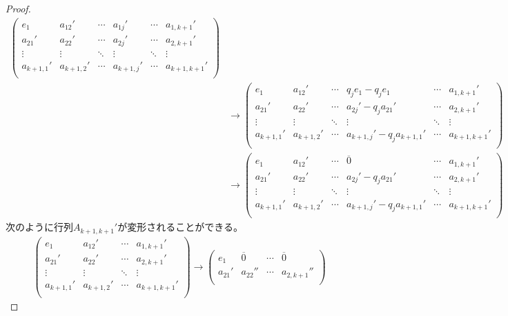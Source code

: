 \documentclass[dvipdfmx]{jsarticle}
\begin{document}
\begin{proof}
\begin{align*}
\begin{pmatrix}
e_{1} & a_{12}' & \cdots & a_{1j}' & \cdots & a_{1,k + 1}' \\
a_{21}' & a_{22}' & \cdots & a_{2j}' & \cdots & a_{2,k + 1}' \\
 \vdots & \vdots & \ddots & \vdots & \ddots & \vdots \\
a_{k + 1,1}' & a_{k + 1,2}' & \cdots & a_{k + 1,j}' & \cdots & a_{k + 1,k + 1}' \\
\end{pmatrix}\\
&\rightarrow \begin{pmatrix}
e_{1} & a_{12}' & \cdots & q_{j}e_{1} - q_{j}e_{1} & \cdots & a_{1,k + 1}' \\
a_{21}' & a_{22}' & \cdots & a_{2j}' - q_{j}a_{21}' & \cdots & a_{2,k + 1}' \\
 \vdots & \vdots & \ddots & \vdots & \ddots & \vdots \\
a_{k + 1,1}' & a_{k + 1,2}' & \cdots & a_{k + 1,j}' - q_{j}a_{k + 1,1}' & \cdots & a_{k + 1,k + 1}' \\
\end{pmatrix}\\
&\rightarrow \begin{pmatrix}
e_{1} & a_{12}' & \cdots & \overline{0} & \cdots & a_{1,k + 1}' \\
a_{21}' & a_{22}' & \cdots & a_{2j}' - q_{j}a_{21}' & \cdots & a_{2,k + 1}' \\
 \vdots & \vdots & \ddots & \vdots & \ddots & \vdots \\
a_{k + 1,1}' & a_{k + 1,2}' & \cdots & a_{k + 1,j}' - q_{j}a_{k + 1,1}' & \cdots & a_{k + 1,k + 1}' \\
\end{pmatrix}
\end{align*}
次のように行列$A_{k + 1,k + 1}'$が変形されることができる。
\begin{align*}
\begin{pmatrix}
e_{1} & a_{12}' & \cdots & a_{1,k + 1}' \\
a_{21}' & a_{22}' & \cdots & a_{2,k + 1}' \\
 \vdots & \vdots & \ddots & \vdots \\
a_{k + 1,1}' & a_{k + 1,2}' & \cdots & a_{k + 1,k + 1}' \\
\end{pmatrix} \rightarrow \begin{pmatrix}
e_{1} & \overline{0} & \cdots & \overline{0} \\
a_{21}' & a_{22}'' & \cdots & a_{2,k + 1}'' \\

\end{pmatrix}
\end{align*}
\end{proof}
\end{document}

